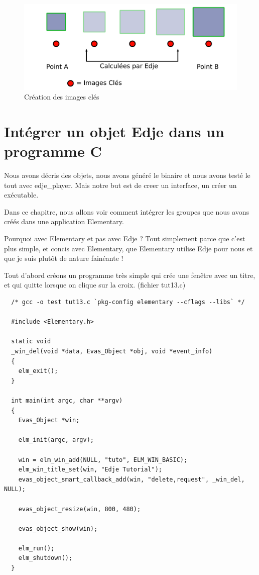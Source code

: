 \documentclass[a4paper]{efr}
\begin{document}
\begin{figure}
  \begin{center}
    \includegraphics[scale=0.5]{images/animation.pdf}
  \end{center}
  \caption{Création des images clés}
\end{figure}

\section{Intégrer un objet Edje dans un programme C}
Nous avons décris des objets, nous avons généré le binaire et nous avons testé
le tout avec edje\_player. Mais notre but est de creer un interface, un créer un
exécutable.

Dans ce chapitre, nous allons voir comment intégrer les groupes que nous avons
créés dans une application Elementary.

Pourquoi avec Elementary et pas avec Edje ? Tout simplement parce que c'est plus
simple, et concis avec Elementary, que Elementary utilise Edje pour nous et que
je suis plutôt de nature fainéante !

Tout d'abord créons un programme très simple qui crée une fenêtre avec un titre,
et qui quitte lorsque on clique sur la croix. (fichier tut13.c)
\begin{lstlisting}
  /* gcc -o test tut13.c `pkg-config elementary --cflags --libs` */

  #include <Elementary.h>

  static void
  _win_del(void *data, Evas_Object *obj, void *event_info)
  {
    elm_exit();
  }

  int main(int argc, char **argv)
  {
    Evas_Object *win;

    elm_init(argc, argv);

    win = elm_win_add(NULL, "tuto", ELM_WIN_BASIC);
    elm_win_title_set(win, "Edje Tutorial");
    evas_object_smart_callback_add(win, "delete,request", _win_del, NULL);

    evas_object_resize(win, 800, 480);

    evas_object_show(win);

    elm_run();
    elm_shutdown();
  }
\end{lstlisting}
\end{document}
